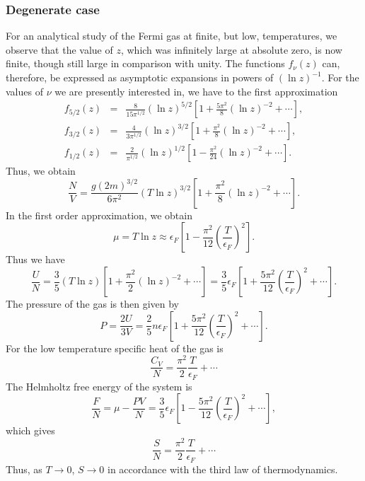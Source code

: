 \subsubsection{Degenerate case}
For an analytical study of the Fermi gas at finite, but low, temperatures, we observe that the value of $z$, which was infinitely large at absolute zero, is now finite, though still large in comparison with unity. 
The functions $f_{\nu}(z)$ can, therefore, be expressed as asymptotic expansions in powers of $(\ln z)^{-1}$.
For the values of $\nu$ we are presently interested in, we have to the first approximation
\begin{eqnarray}
f_{5/2}(z) &=& \frac{8}{15\pi^{1/2}} (\ln z)^{5/2} \left[ 1 + \frac{5\pi^2}{8}(\ln z)^{-2} + \cdots \right], \nonumber \\
f_{3/2}(z) &=& \frac{4}{3\pi^{1/2}} (\ln z)^{3/2} \left[ 1 + \frac{\pi^2}{8}(\ln z)^{-2} + \cdots \right] ,\nonumber \\
f_{1/2}(z) &=& \frac{2}{\pi^{1/2}} (\ln z)^{1/2} \left[ 1 - \frac{\pi^2}{24}(\ln z)^{-2} + \cdots \right] .\nonumber
\end{eqnarray}
Thus, we obtain
\[\frac{N}{V} = \frac{g(2m)^{3/2}}{6\pi^2} (T\ln z)^{3/2} \left[ 1 + \frac{\pi^2}{8}(\ln z)^{-2} + \cdots \right] .\]
In the first order approximation, we obtain
\[\mu = T\ln z \approx \epsilon_F \left[ 1 - \frac{\pi^2}{12} \left( \frac{T}{\epsilon_F} \right)^2 \right].\]
Thus we have
\[\frac{U}{N} = \frac{3}{5} (T \ln z) \left[ 1 + \frac{\pi^2}{2}(\ln z)^{-2} + \cdots \right] = \frac{3}{5}\epsilon_F \left[ 1 + \frac{5\pi^2}{12}\left( \frac{T}{\epsilon_F} \right)^2 + \cdots \right].\]
The pressure of the gas is then given by
\[P = \frac{2U}{3V} = \frac{2}{5}n\epsilon_F\left[ 1 + \frac{5\pi^2}{12}\left( \frac{T}{\epsilon_F} \right)^2 + \cdots \right] .\]
For the low temperature specific heat of the gas is
\[\frac{C_V}{N} = \frac{\pi^2}{2} \frac{T}{\epsilon_F} + \cdots\]
The Helmholtz free energy of the system is
\[\frac{F}{N} = \mu - \frac{PV}{N} = \frac{3}{5}\epsilon_F\left[ 1 - \frac{5\pi^2}{12}\left( \frac{T}{\epsilon_F} \right)^2 + \cdots \right] ,\]
which gives
\[\frac{S}{N} = \frac{\pi^2}{2}\frac{T}{\epsilon_F} + \cdots\]
Thus, as $T \to 0$, $S \to 0$ in accordance with the third law of thermodynamics.

